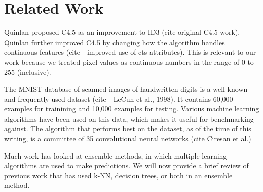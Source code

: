 \section{Related Work}
Quinlan proposed C4.5 as an improvement to ID3 (cite original C4.5 work). Quinlan further improved C4.5 by changing how the algorithm handles continuous features (cite - improved use of cts attributes). This is relevant to our work because we treated pixel values as continuous numbers in the range of 0 to 255 (inclusive). 

The MNIST database of scanned images of handwritten digits is a well-known and frequently used dataset (cite - LeCun et al., 1998). It contains 60,000 examples for trainining and 10,000 examples for testing. Various machine learning algorithms have been used on this data, which makes it useful for benchmarking against. The algorithm that performs best on the dataset, as of the time of this writing, is a committee of 35 convolutional neural networks (cite Ciresan et al.)

Much work has looked at ensemble methods, in which multiple learning algorithms are used to make predictions. We will now provide a brief review of previous work that has used k-NN, decision trees, or both in an ensemble method.
